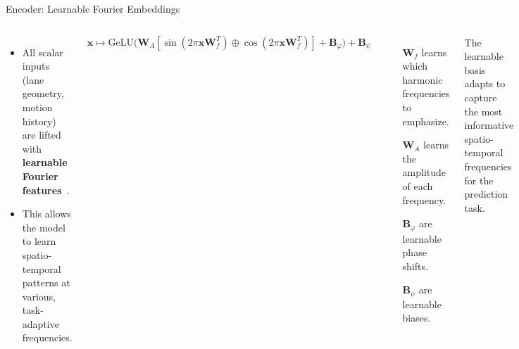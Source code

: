 \documentclass[10pt,aspectratio=169]{beamer}
\begin{document}
\begin{frame}{Encoder: Learnable Fourier Embeddings}
  \begin{columns}[T]
      \begin{itemize}
        \item All scalar inputs (lane geometry, motion history) are lifted with \textbf{learnable Fourier features}~\cite{li2021llearnableFourier}.
        \item This allows the model to learn spatio-temporal patterns at various, task-adaptive frequencies.
      \end{itemize}
      \begin{equation}
        \label{eq:pres_learnable_fourier_embedding}
        \mathbf{x} \mapsto \text{GeLU}\!\bigl(\mathbf{W}_A [\sin(2\pi \mathbf{x}\mathbf{W}_f^T)\oplus\cos(2\pi \mathbf{x}\mathbf{W}_f^T)] + \mathbf{B}_\varphi\bigr) + \mathbf{B}_\psi
      \end{equation}
      \begin{itemize}
        \item[\(\mathbf{W}_f\)] learns which harmonic frequencies to emphasize.
        \item[\(\mathbf{W}_A\)] learns the amplitude of each frequency.
        \item[\(\mathbf{B}_\varphi\)] are learnable phase shifts.
        \item[\(\mathbf{B}_\psi\)] are learnable biases.
      \end{itemize}
      \vspace{1em}
      \small{The learnable basis adapts to capture the most informative spatio-temporal frequencies for the prediction task.}


\end{columns}
\end{frame}
\end{document}
